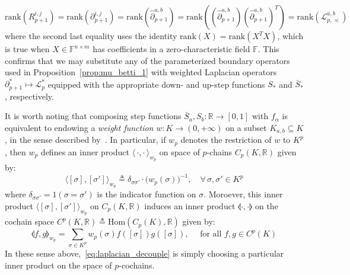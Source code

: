 \begin{equation}
	\mathrm{rank}(R_{p+1}^{i,j}) = \mathrm{rank}(\partial_{p+1}^{i, j}) = \mathrm{rank}(\hat{\partial}_{p+1}^{a,b}) = \mathrm{rank}\left((\hat{\partial}_{p+1}^{a,b})(\hat{\partial}_{p+1}^{a,b})^T \right) = \mathrm{rank}(\mathcal{L}_{p, \preceq}^{a,b})
\end{equation}
where the second last equality uses the identity $\mathrm{rank}(X) = \mathrm{rank}(X^T X)$, which is true when $X \in \mathbb{F}^{n \times m}$ has coefficients in a zero-characteristic field $\mathbb{F}$. This confirms that we may substitute any of the parameterized boundary operators used in Proposition~\ref{prop:mu_betti_1}  with weighted Laplacian operators $\partial_{p+1}^\ast \mapsto \mathcal{L}_p^\ast$ equipped with the appropriate down- and up-step functions $S_\ast$ and $\bar{S}_\ast$, respectively.   

It is worth noting that composing step functions $\bar{S}_a, S_b : \mathbb{R} \to [0, 1]$ with $f_\alpha$ is equivalent to endowing a \emph{weight function} $w: K \to (0, +\infty)$ on a subset $K_{a,b} \subseteq K$, in the sense described by~\cite{memoli2022persistent}.
In particular, if $w_p$ denotes the restriction of $w$ to $K^p$, 
then $w_p$ defines an inner product $\langle \, \cdot, \cdot \,\rangle_{w_p}$ on space of $p$-chains $C_p(K, \mathbb{R})$ given by:
$$\langle [\sigma], [\sigma'] \rangle_{w_p} \triangleq \delta_{\sigma \sigma'} \cdot \big(w_p(\sigma)\big)^{-1}, \quad \forall \, \sigma, \sigma' \in K^p$$
where $\delta_{\sigma \sigma'} = \mathcal{1}(\sigma = \sigma')$ is the indicator function on $\sigma$. 
Moroever, this inner product $\langle [\sigma], [\sigma'] \rangle_{w_p}$ on $C_p(K, \mathbb{R})$ induces an inner product $\llangle \cdot, \cdot \rrangle$ on the cochain space $C^p(K, \mathbb{R}) \triangleq \mathrm{Hom}(C_p(K), \mathbb{R})$ given by:
$$ \llangle f, g \rrangle_{w_p} = \sum\limits_{\sigma \in K^p} w_p(\sigma) f([\sigma]) g([\sigma]), \quad \text{ for all } f,g \in C^p(K) $$ 
In these sense above,~\eqref{eq:laplacian_decouple} is simply choosing a particular inner product on the space of $p$-cochains. 


